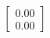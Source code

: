 \documentclass[preview]{standalone}
\begin{document}
\begin{align*}
\begin{bmatrix} 0.00 \\ 0.00 \end{bmatrix}
\end{align*}
\end{document}
